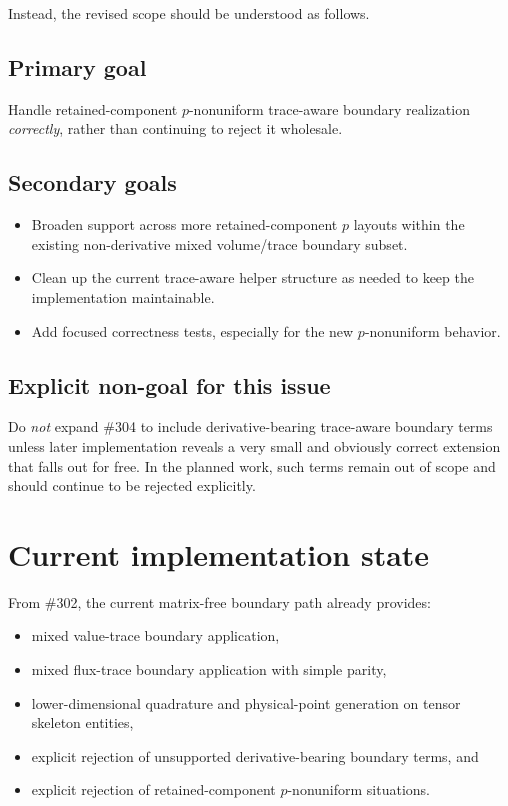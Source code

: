 \documentclass[11pt]{article}
\begin{document}
Instead, the revised scope should be understood as follows.

\subsection{Primary goal}

Handle retained-component \(p\)-nonuniform trace-aware boundary realization \emph{correctly}, rather than continuing to reject it wholesale.

\subsection{Secondary goals}

\begin{itemize}[leftmargin=*]
  \item Broaden support across more retained-component \(p\) layouts within the existing non-derivative mixed volume/trace boundary subset.
  \item Clean up the current trace-aware helper structure as needed to keep the implementation maintainable.
  \item Add focused correctness tests, especially for the new \(p\)-nonuniform behavior.
\end{itemize}

\subsection{Explicit non-goal for this issue}

Do \emph{not} expand \#304 to include derivative-bearing trace-aware boundary terms unless later implementation reveals a very small and obviously correct extension that falls out for free. In the planned work, such terms remain out of scope and should continue to be rejected explicitly.

\section{Current implementation state}

From \#302, the current matrix-free boundary path already provides:
\begin{itemize}[leftmargin=*]
  \item mixed value-trace boundary application,
  \item mixed flux-trace boundary application with simple parity,
  \item lower-dimensional quadrature and physical-point generation on tensor skeleton entities,
  \item explicit rejection of unsupported derivative-bearing boundary terms, and
  \item explicit rejection of retained-component \(p\)-nonuniform situations.
\end{itemize}
\end{document}
